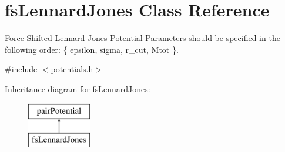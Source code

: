 \hypertarget{classfs_lennard_jones}{\section{fs\-Lennard\-Jones Class Reference}
\label{classfs_lennard_jones}
}


Force-\/\-Shifted Lennard-\/\-Jones Potential Parameters should be specified in the following order\-: \{ epsilon, sigma, r\-\_\-cut, Mtot \}.  




{\ttfamily \#include $<$potentials.\-h$>$}

Inheritance diagram for fs\-Lennard\-Jones\-:\begin{figure}[H]
\begin{center}
\leavevmode
\includegraphics[height=2.000000cm]{classfs_lennard_jones}
\end{center}
\end{figure}
